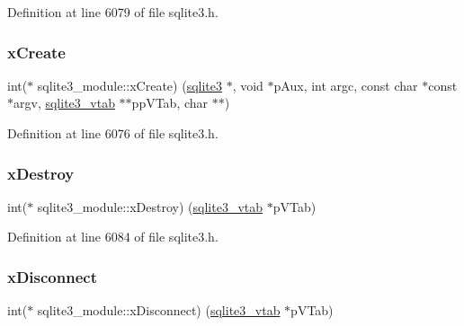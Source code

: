 Definition at line 6079 of file sqlite3.\+h.

\mbox{\label{structsqlite3__module_a5934e38da1222cac999d01d372af293e}} 
\subsubsection{\texorpdfstring{x\+Create}{xCreate}}
{\footnotesize\ttfamily int($\ast$ sqlite3\+\_\+module\+::x\+Create) (\mbox{\hyperlink{sqlite3_8h_a0ef6f2646262c8a9b24368d8ac140f69}{sqlite3}} $\ast$, void $\ast$p\+Aux, int argc, const char $\ast$const  $\ast$argv, \mbox{\hyperlink{structsqlite3__vtab}{sqlite3\+\_\+vtab}} $\ast$$\ast$pp\+V\+Tab, char $\ast$$\ast$)}



Definition at line 6076 of file sqlite3.\+h.

\mbox{\label{structsqlite3__module_a0ec3414a65bb24f400e8cfd820751412}} 
\subsubsection{\texorpdfstring{x\+Destroy}{xDestroy}}
{\footnotesize\ttfamily int($\ast$ sqlite3\+\_\+module\+::x\+Destroy) (\mbox{\hyperlink{structsqlite3__vtab}{sqlite3\+\_\+vtab}} $\ast$p\+V\+Tab)}



Definition at line 6084 of file sqlite3.\+h.

\mbox{\label{structsqlite3__module_a0107afd3c350db14098edbaae04342df}} 
\subsubsection{\texorpdfstring{x\+Disconnect}{xDisconnect}}
{\footnotesize\ttfamily int($\ast$ sqlite3\+\_\+module\+::x\+Disconnect) (\mbox{\hyperlink{structsqlite3__vtab}{sqlite3\+\_\+vtab}} $\ast$p\+V\+Tab)}



